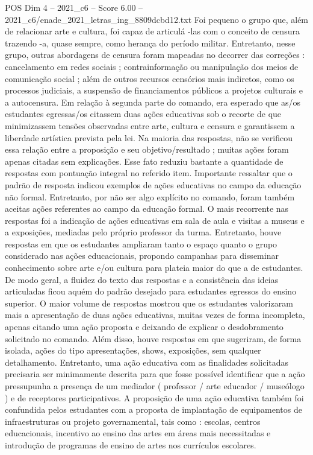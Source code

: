 \begin{textsample}{POS Dim 4 – 2021\_c6 – Score 6.00 – 2021\_c6/enade\_2021\_letras\_ing\_8809dcbd12.txt}
Foi pequeno o grupo que, além de relacionar arte e cultura, foi capaz de articulá -las com o conceito de censura trazendo -a, quase sempre, como herança do período militar.
Entretanto, nesse grupo, outras abordagens de censura foram mapeadas no decorrer das correções : cancelamento em redes sociais ; contrainformação ou manipulação dos meios de comunicação social ; além de outros recursos censórios mais indiretos, como os processos judiciais, a suspensão de financiamentos públicos a projetos culturais e a autocensura.
Em relação à segunda parte do comando, era esperado que as/os estudantes egressas/os citassem duas ações educativas sob o recorte de que minimizassem tensões observadas entre arte, cultura e censura e garantissem a liberdade artística prevista pela lei.
Na maioria das respostas, não se verificou essa relação entre a proposição e seu objetivo/resultado ; muitas ações foram apenas citadas sem explicações.
Esse fato reduziu bastante a quantidade de respostas com pontuação integral no referido item.
Importante ressaltar que o padrão de resposta indicou exemplos de ações educativas no campo da educação não formal.
Entretanto, por não ser algo explícito no comando, foram também aceitas ações referentes ao campo da educação formal.
O mais recorrente nas respostas foi a indicação de ações educativas em sala de aula e visitas a museus e a exposições, mediadas pelo próprio professor da turma.
Entretanto, houve respostas em que os estudantes ampliaram tanto o espaço quanto o grupo considerado nas ações educacionais, propondo campanhas para disseminar conhecimento sobre arte e/ou cultura para plateia maior do que a de estudantes.
De modo geral, a fluidez do texto das respostas e a consistência das ideias articuladas ficou aquém do padrão desejado para estudantes egressos do ensino superior.
O maior volume de respostas mostrou que os estudantes valorizaram mais a apresentação de duas ações educativas, muitas vezes de forma incompleta, apenas citando uma ação proposta e deixando de explicar o desdobramento solicitado no comando.
Além disso, houve respostas em que sugeriram, de forma isolada, ações do tipo apresentações, shows, exposições, sem qualquer detalhamento.
Entretanto, uma ação educativa com as finalidades solicitadas precisaria ser minimamente descrita para que fosse possível identificar que a ação pressupunha a presença de um mediador ( professor / arte educador / museólogo ) e de receptores participativos.
A proposição de uma ação educativa também foi confundida pelos estudantes com a proposta de implantação de equipamentos de infraestruturas ou projeto governamental, tais como : escolas, centros educacionais, incentivo ao ensino das artes em áreas mais necessitadas e introdução de programas de ensino de artes nos currículos escolares.

\end{textsample}
